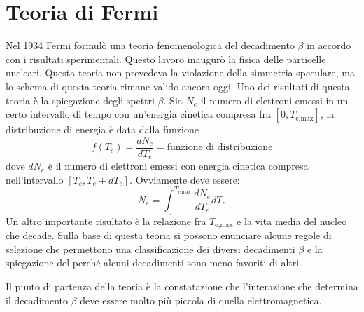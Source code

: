 \chapter{Teoria di Fermi}

Nel 1934 Fermi formulò una teoria fenomenologica del decadimento $\beta$ in 
accordo con i risultati sperimentali. Questo lavoro inaugurò la fisica delle 
particelle nucleari.
Questa teoria non prevedeva la violazione della simmetria speculare, ma lo 
schema di questa teoria rimane valido ancora oggi. Uno dei risultati di questa 
teoria è la spiegazione
degli spettri $\beta$. Sia $N_e$ il numero di elettroni emessi in un certo 
intervallo di tempo con un'energia cinetica compresa fra 
$[0,T_{\text{e,max}}]$, la distribuzione
di energia è data dalla funzione
\[
f(T_e)=\frac{dN_e}{dT_e}=\text{funzione di distribuzione}
\]
dove $dN_e$ è il numero di elettroni emessi con energia cinetica compresa 
nell'intervallo $[T_e,T_e+dT_e]$. Ovviamente deve essere:
\[
N_e=\int_0^{T_{\text{e,max}}}\frac{dN_e}{dT_e}dT_e
\]
Un altro importante risultato è la relazione fra $T_{\text{e,max}}$ e la vita 
media del nucleo che decade. Sulla base di questa teoria si possono enunciare 
alcune regole di selezione
che permettono una classificazione dei diversi decadimenti $\beta$ e la 
spiegazione del perché alcuni decadimenti sono meno favoriti di altri.

Il punto di partenza della teoria è la constatazione che l'interazione che 
determina il decadimento $\beta$ deve essere molto più piccola di quella 
elettromagnetica.

